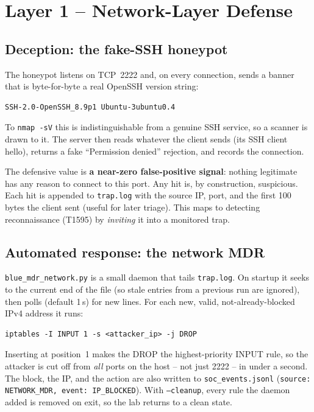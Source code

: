 \documentclass[11pt]{article}
\newcommand{\co}[1]{\texttt{#1}}
\begin{document}
\section{Layer 1 -- Network-Layer Defense}

\subsection{Deception: the fake-SSH honeypot}
The honeypot listens on TCP~2222 and, on every connection, sends a banner
that is byte-for-byte a real OpenSSH version string:
\begin{lstlisting}
SSH-2.0-OpenSSH_8.9p1 Ubuntu-3ubuntu0.4
\end{lstlisting}
To \co{nmap -sV} this is indistinguishable from a genuine SSH service, so a
scanner is drawn to it. The server then reads whatever the client sends
(its SSH client hello), returns a fake ``Permission denied'' rejection, and
records the connection.

The defensive value is \textbf{a near-zero false-positive signal}: nothing
legitimate has any reason to connect to this port. Any hit is, by
construction, suspicious. Each hit is appended to \co{trap.log} with the
source IP, port, and the first 100 bytes the client sent (useful for later
triage). This maps to detecting reconnaissance (T1595) by \emph{inviting}
it into a monitored trap.

\subsection{Automated response: the network MDR}
\co{blue\_mdr\_network.py} is a small daemon that tails \co{trap.log}.
On startup it seeks to the current end of the file (so stale entries from a
previous run are ignored), then polls (default 1\,s) for new lines. For each
new, valid, not-already-blocked IPv4 address it runs:
\begin{lstlisting}
iptables -I INPUT 1 -s <attacker_ip> -j DROP
\end{lstlisting}
Inserting at position~1 makes the DROP the highest-priority INPUT rule, so
the attacker is cut off from \emph{all} ports on the host -- not just 2222 --
in under a second. The block, the IP, and the action are also written to
\co{soc\_events.jsonl} (\co{source: NETWORK\_MDR, event: IP\_BLOCKED}). With
\co{--cleanup}, every rule the daemon added is removed on exit, so the lab
returns to a clean state.
\end{document}
